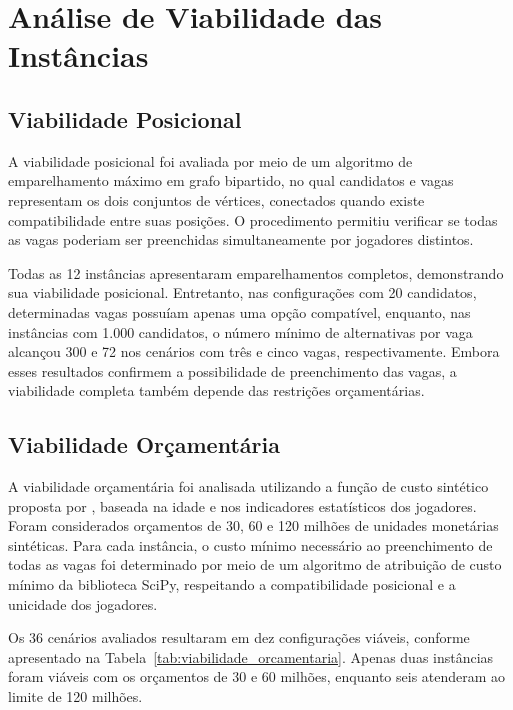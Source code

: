 \documentclass[12pt,a4paper]{article}
\begin{document}
\section{Análise de Viabilidade das Instâncias}

\subsection{Viabilidade Posicional}

A viabilidade posicional foi avaliada por meio de um algoritmo de emparelhamento máximo em grafo bipartido, no qual candidatos e vagas representam os dois conjuntos de vértices, conectados quando existe compatibilidade entre suas posições. O procedimento permitiu verificar se todas as vagas poderiam ser preenchidas simultaneamente por jogadores distintos.

Todas as 12 instâncias apresentaram emparelhamentos completos, demonstrando sua viabilidade posicional. Entretanto, nas configurações com 20 candidatos, determinadas vagas possuíam apenas uma opção compatível, enquanto, nas instâncias com 1.000 candidatos, o número mínimo de alternativas por vaga alcançou 300 e 72 nos cenários com três e cinco vagas, respectivamente. Embora esses resultados confirmem a possibilidade de preenchimento das vagas, a viabilidade completa também depende das restrições orçamentárias.

\subsection{Viabilidade Orçamentária}

A viabilidade orçamentária foi analisada utilizando a função de custo sintético proposta por \textcite{nunes2026}, baseada na idade e nos indicadores estatísticos dos jogadores. Foram considerados orçamentos de 30, 60 e 120 milhões de unidades monetárias sintéticas. Para cada instância, o custo mínimo necessário ao preenchimento de todas as vagas foi determinado por meio de um algoritmo de atribuição de custo mínimo da biblioteca SciPy, respeitando a compatibilidade posicional e a unicidade dos jogadores.

Os 36 cenários avaliados resultaram em dez configurações viáveis, conforme apresentado na Tabela~\ref{tab:viabilidade_orcamentaria}. Apenas duas instâncias foram viáveis com os orçamentos de 30 e 60 milhões, enquanto seis atenderam ao limite de 120 milhões.
\end{document}
